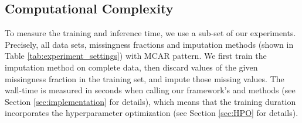 \subsection{Computational Complexity}
%
To measure the training and inference time, we use a sub-set of our experiments. Precisely, all data sets, missingness fractions and imputation methods (shown in Table \ref{tab:experiment_settings}) with MCAR pattern. We first train the imputation method on complete data, then discard values of the given missingness fraction in the training set, and impute those missing values. The wall-time is measured in seconds when calling our framework's  and  methods (see Section \ref{sec:implementation} for details), which means that the training duration incorporates the hyperparameter optimization (see Section \ref{sec:HPO} for details).

